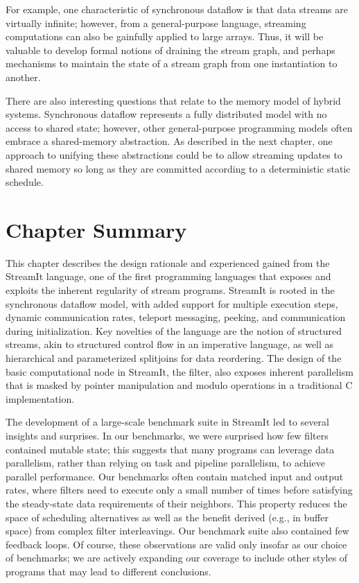 \begin{enumerate}
  For example, one characteristic of synchronous dataflow is that data
  streams are virtually infinite; however, from a general-purpose
  language, streaming computations can also be gainfully applied to
  large arrays.  Thus, it will be valuable to develop formal notions
  of draining the stream graph, and perhaps mechanisms to maintain the
  state of a stream graph from one instantiation to another.

  There are also interesting questions that relate to the memory model
  of hybrid systems.  Synchronous dataflow represents a fully
  distributed model with no access to shared state; however, other
  general-purpose programming models often embrace a shared-memory
  abstraction.  As described in the next chapter, one approach to
  unifying these abstractions could be to allow streaming updates to
  shared memory so long as they are committed according to a
  deterministic static schedule.

\end{enumerate}

\section{Chapter Summary}

This chapter describes the design rationale and experienced gained
from the StreamIt language, one of the first programming languages
that exposes and exploits the inherent regularity of stream programs.
StreamIt is rooted in the synchronous dataflow model, with added
support for multiple execution steps, dynamic communication rates,
teleport messaging, peeking, and communication during initialization.
Key novelties of the language are the notion of structured streams,
akin to structured control flow in an imperative language, as well as
hierarchical and parameterized splitjoins for data reordering.  The
design of the basic computational node in StreamIt, the filter, also
exposes inherent parallelism that is masked by pointer manipulation
and modulo operations in a traditional C implementation.

The development of a large-scale benchmark suite in StreamIt led to
several insights and surprises.  In our benchmarks, we were surprised
how few filters contained mutable state; this suggests that many
programs can leverage data parallelism, rather than relying on task
and pipeline parallelism, to achieve parallel performance.  Our
benchmarks often contain matched input and output rates, where filters
need to execute only a small number of times before satisfying the
steady-state data requirements of their neighbors.  This property
reduces the space of scheduling alternatives as well as the benefit
derived (e.g., in buffer space) from complex filter interleavings.
Our benchmark suite also contained few feedback loops.  Of course,
these observations are valid only insofar as our choice of benchmarks;
we are actively expanding our coverage to include other styles of
programs that may lead to different conclusions.

